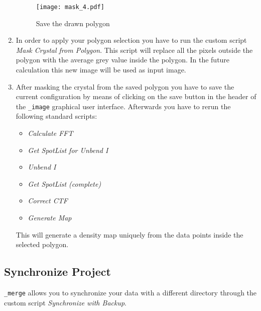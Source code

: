 \begin{enumerate}
	\begin{figure}[H]
		\centering
		\texttt{[image: mask\_4.pdf]}
		\caption{Save the drawn polygon}
		\label{fig:mask_t_4}
	\end{figure}
	
	\item In order to apply your polygon selection you have to run the custom script \textit{Mask Crystal from Polygon}. This script will replace all the pixels outside the polygon with the average grey value inside the polygon. In the future calculation this new image will be used as input image.
	
	\item After masking the crystal from the saved polygon you have to save the current configuration by means of clicking on the save button in the header of the {\twodx}\texttt{\_image} graphical user interface. Afterwards you have to rerun the following standard scripts:
		\begin{itemize}
			\item \textit{Calculate FFT}
			\item \textit{Get SpotList for Unbend I}
			\item \textit{Unbend I}
			\item \textit{Get SpotList (complete)}
			\item \textit{Correct CTF}
			\item \textit{Generate Map}
		\end{itemize}
	
	This will generate a density map uniquely from the data points inside the selected polygon.
	
\end{enumerate}


\subsection{Synchronize Project}
\label{sec:sync_project}

{\twodx}\texttt{\_merge} allows you to synchronize your data with a different directory through the custom script \textit{Synchronize with Backup}.








